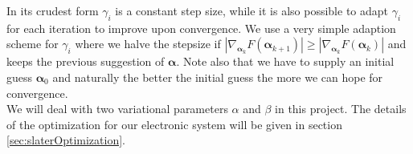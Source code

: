 \documentclass[english, a4paper]{article}
\begin{document}
\noindent In its crudest form $\gamma_i$ is a constant step size, while it is also possible to adapt $\gamma_i$ 
for each iteration to improve upon
convergence. We use a very simple adaption scheme for $\gamma_i$ where we halve the stepsize if
$|\nabla_{{\bm \alpha}_{k}}F({\bm \alpha}_{k+1})| \geq |\nabla_{{\bm \alpha}_{k}}F({\bm \alpha}_k)|$ 
and keeps the previous suggestion of ${\bm \alpha}$. Note also that we have to supply an initial 
guess ${\bm \alpha}_0$ and naturally the better the initial 
guess the more we can hope for convergence.\\

\noindent
We will deal with two variational parameters $\alpha$ and $\beta$ in this project. 
The details of the optimization for our electronic system will be given in section \ref{sec:slaterOptimization}.
\end{document}
